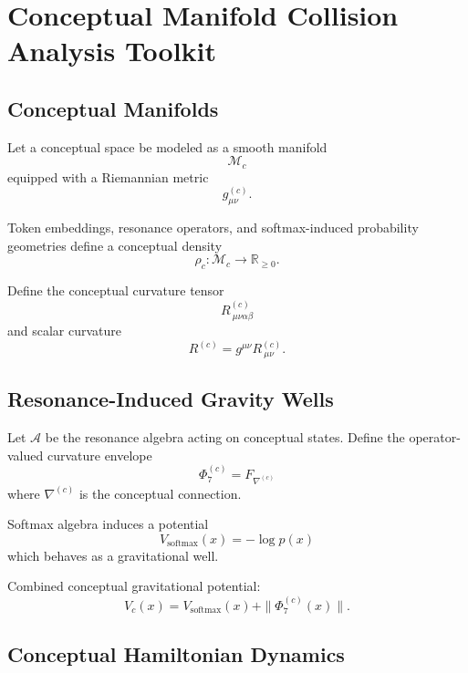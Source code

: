 
\section{Conceptual Manifold Collision Analysis Toolkit}
\label{sec:conceptual_collision_toolkit}

\subsection{Conceptual Manifolds}

Let a conceptual space be modeled as a smooth manifold
\[
\mathcal{M}_c
\]
equipped with a Riemannian metric
\[
g^{(c)}_{\mu\nu}.
\]

Token embeddings, resonance operators, and softmax-induced probability
geometries define a conceptual density
\[
\rho_c : \mathcal{M}_c \to \mathbb{R}_{\ge 0}.
\]

Define the conceptual curvature tensor
\[
R^{(c)}_{\ \mu\nu\alpha\beta}
\]
and scalar curvature
\[
R^{(c)} = g^{\mu\nu} R^{(c)}_{\ \mu\nu}.
\]

\subsection{Resonance-Induced Gravity Wells}

Let $\mathcal{A}$ be the resonance algebra acting on conceptual states.
Define the operator-valued curvature envelope
\[
\Phi_7^{(c)} = F_{\nabla^{(c)}}
\]
where $\nabla^{(c)}$ is the conceptual connection.

Softmax algebra induces a potential
\[
V_{\text{softmax}}(x) = -\log p(x)
\]
which behaves as a gravitational well.

Combined conceptual gravitational potential:
\[
V_c(x) = V_{\text{softmax}}(x) + \|\Phi_7^{(c)}(x)\|.
\]

\subsection{Conceptual Hamiltonian Dynamics}

